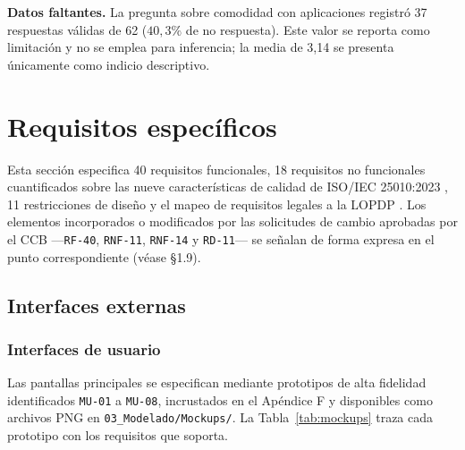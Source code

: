 \documentclass[11pt,a4paper]{article}
\newcommand{\id}[1]{\texttt{\begingroup\hyphenpenalty=10000\relax#1\endgroup}}
\renewcommand{\id}[1]{\texttt{#1}}
\begin{document}
\textbf{Datos faltantes.} La pregunta sobre comodidad con aplicaciones registró 37 respuestas
válidas de 62 ($40{,}3\%$ de no respuesta). Este valor se reporta como limitación y no se emplea
para inferencia; la media de 3{,}14 se presenta únicamente como indicio descriptivo.

\newpage
\section{Requisitos específicos}

Esta sección especifica 40 requisitos funcionales, 18 requisitos no funcionales cuantificados sobre
las nueve características de calidad de ISO/IEC 25010:2023 \cite{iso25010}, 11 restricciones de
diseño y el mapeo de requisitos legales a la LOPDP \cite{lopdp}. Los elementos incorporados o
modificados por las solicitudes de cambio aprobadas por el CCB ---\id{RF-40}, \id{RNF-11},
\id{RNF-14} y \id{RD-11}--- se señalan de forma expresa en el punto correspondiente (véase §1.9).

\subsection{Interfaces externas}

\subsubsection{Interfaces de usuario}

Las pantallas principales se especifican mediante prototipos de alta fidelidad identificados
\id{MU-01} a \id{MU-08}, incrustados en el Apéndice F y disponibles como archivos PNG en
\id{03\_Modelado/Mockups/}. La Tabla~\ref{tab:mockups} traza cada prototipo con los requisitos que
soporta.
\end{document}
